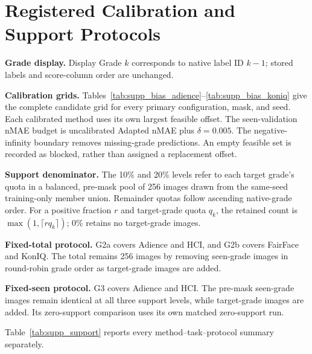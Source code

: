 \clearpage
\setcounter{page}{1}
\maketitlesupplementary

\section{Registered Calibration and Support Protocols}
\label{sec:supp_protocols}

\noindent\textbf{Grade display.}
Display Grade $k$ corresponds to native label ID $k-1$; stored labels and score-column order are unchanged.

\noindent\textbf{Calibration grids.}
Tables~\ref{tab:supp_bias_adience}--\ref{tab:supp_bias_koniq} give the complete candidate grid for every primary configuration, mask, and seed.
Each calibrated method uses its own largest feasible offset.
The seen-validation nMAE budget is uncalibrated Adapted nMAE plus $\delta=0.005$.
The negative-infinity boundary removes missing-grade predictions.
An empty feasible set is recorded as blocked, rather than assigned a replacement offset.

\noindent\textbf{Support denominator.}
The 10\% and 20\% levels refer to each target grade's quota in a balanced, pre-mask pool of 256 images drawn from the same-seed training-only member union.
Remainder quotas follow ascending native-grade order.
For a positive fraction $r$ and target-grade quota $q_k$, the retained count is $\max(1,\lceil r q_k\rceil)$; 0\% retains no target-grade images.

\noindent\textbf{Fixed-total protocol.}
G2a covers Adience and HCI, and G2b covers FairFace and KonIQ.
The total remains 256 images by removing seen-grade images in round-robin grade order as target-grade images are added.

\noindent\textbf{Fixed-seen protocol.}
G3 covers Adience and HCI.
The pre-mask seen-grade images remain identical at all three support levels, while target-grade images are added.
Its zero-support comparison uses its own matched zero-support run.

Table~\ref{tab:supp_support} reports every method--task--protocol summary separately.


